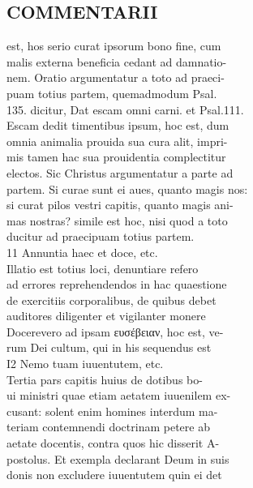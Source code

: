 \documentclass{article}
\begin{document}
\begin{pages}
\section*{COMMENTARII \\
                }est, hos serio curat ipsorum bono fine, cum \\
                malis externa beneficia cedant ad damnatio- \\
                nem. Oratio argumentatur a toto ad praeci- \\
                puam totius partem, quemadmodum Psal. \\
                135. dicitur, Dat escam omni carni. et Psal.111. \\
                Escam dedit timentibus ipsum, hoc est, dum \\
                omnia animalia prouida sua cura alit, impri- \\
                mis tamen hac sua prouidentia complectitur \\
                electos. Sic Christus argumentatur a parte ad \\
                partem. Si curae sunt ei aues, quanto magis nos: \\
                si curat pilos vestri capitis, quanto magis ani- \\
                mas nostras? simile est hoc, nisi quod a toto \\
                ducitur ad praecipuam totius partem. \\
                11 Annuntia haec et doce, etc. \\
                Illatio est totius loci, denuntiare refero \\
                ad errores reprehendendos in hac quaestione \\
                de exercitiis corporalibus, de quibus debet \\
                auditores diligenter et vigilanter monere \\
                Docerevero ad ipsam ευσέβειαν, hoc est, ve- \\
                rum Dei cultum, qui in his sequendus est \\
                I2 Nemo tuam iuuentutem, etc. \\
                Tertia pars capitis huius de dotibus bo- \\
                ui ministri quae etiam aetatem iuuenilem ex- \\
                cusant: solent enim homines interdum ma- \\
                teriam contemnendi doctrinam petere ab \\
                aetate docentis, contra quos hic disserit A- \\
                postolus. Et exempla declarant Deum in suis \\
                donis non excludere iuuentutem quin ei det \\
                

\end{pages}
\end{document}
